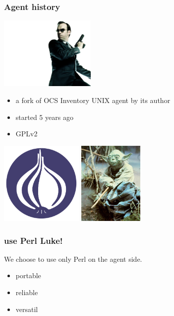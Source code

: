 %
\begin{frame}
    \frametitle{Agent history}

    \begin{center}
    \includegraphics[height=3.5cm]{./pics/agent-smith.jpg}
    \end{center}


    \begin{itemize}
        \item a fork of OCS Inventory UNIX agent by its author
        \item started 5 years ago
        \item GPLv2
    \end{itemize}
\end{frame}

\begin{frame}
    \begin{center}
    \includegraphics[height=4.0cm]{pics/Perl_Foundation.pdf}
    \includegraphics[height=4.0cm]{pics/yoda.jpg}
    \end{center}
    \frametitle{use Perl Luke!}

    We choose to use only Perl on the agent side.
    \begin{itemize}
        \item portable
        \item reliable
        \item versatil
    \end{itemize}
\end{frame}

